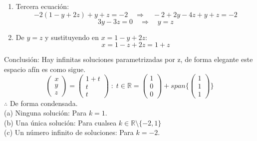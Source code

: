 \begin{solution}
\begin{enumerate}
    \item Tercera ecuación:
\[
          -2(1 - y + 2z) + y + z = -2 \quad \Rightarrow \quad -2 + 2y - 4z + y + z = -2
          \]
\[
          3y - 3z = 0 \quad \Rightarrow \quad y = z
          \]
    \item De \( y = z \) y sustituyendo en \( x = 1 - y + 2z \):
\[
        x = 1 - z + 2z = 1 + z
        \]
\end{enumerate}
Conclusión: Hay infinitas soluciones parametrizadas por z, de forma elegante este espacio afín es como sigue.
\[
\begin{pmatrix} x \\ y \\ z \end{pmatrix} = \begin{pmatrix} 1 + t \\ t \\ t \end{pmatrix} \; : \; t\in\mathbb{R}  = \begin{pmatrix} 1 \\ 0 \\ 0 \end{pmatrix} + span \Bigg\{ \begin{pmatrix} 1 \\ 1 \\ 1 \end{pmatrix} \Bigg\}
\]
$\therefore$ De forma condensada. \\
(a) Ninguna solución: Para $k=1$. \\
(b) Una única solución: Para cualsea $k\in \mathbb{R}\setminus\{-2,1\}$ \\
(c) Un número infinito de soluciones: Para $k=−2$.
\end{solution}